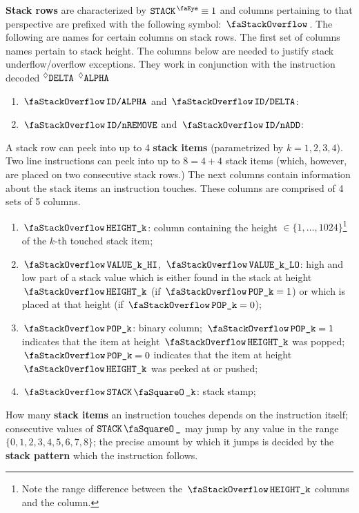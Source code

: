 \begin{center}
\end{center}
\textbf{Stack rows}\label{def: stack row} are characterized by $\peekStack \equiv 1$ and columns pertaining to that perspective are prefixed with the following symbol: $\stackSignifier$.
The following are names for certain columns on stack rows.
The first set of columns names pertain to stack height.
The columns below are needed to justify stack underflow/overflow exceptions.
They work in conjunction with the instruction decoded $\prescript{\lozenge}{}{\texttt{DELTA}}$ $\prescript{\lozenge}{}{\texttt{ALPHA}}$
\begin{enumerate}[resume]
	\item $\stackAlpha$    and $\stackDelta$:
	\item $\stackNbRemove$ and $\stackNbAdd$:
\end{enumerate}
A stack row can peek into up to 4 \textbf{stack items} (parametrized by $k=1,2,3,4$).
Two line instructions can peek into up to $8 = 4 + 4$ stack items (which, however, are placed on two consecutive stack rows.)
The next columns contain information about the stack items an instruction touches.
These columns are comprised of 4 sets of 5 columns.
\begin{enumerate}[resume]
	\item $\stackItemHeight{k}$:
		column containing the height $\in\{1,\dots,1024\}$\footnote{Note the range difference between the $\stackItemHeight{k}$ columns and the \stackHeight{} column.} of the $k$-th touched stack item;
	\item $\stackItemValHi{k}$, $\stackItemValLo{k}$:
		high and low part of a stack value which is either found in the stack at height $\stackItemHeight{k}$ (if $\stackItemPop{k} = 1$) or which is placed at that height (if $\stackItemPop{k} = 0$);
	\item $\stackItemPop{k}$:
		binary column; $\stackItemPop{k} = 1$ indicates that the item at height $\stackItemHeight{k}$ was popped; $\stackItemPop{k} = 0$ indicates that the item at height $\stackItemHeight{k}$ was peeked at or pushed; 
	\item $\stackItemStamp{k}$:
		stack stamp;
\end{enumerate}
How many \textbf{stack items} an instruction touches depends on the instruction itself; consecutive values of $\sStamp{}$ may jump by any value in the range $\{0,1,2,3,4,5,6,7,8\}$; the precise amount by which it jumps is decided by the \textbf{stack pattern} which the instruction follows.
